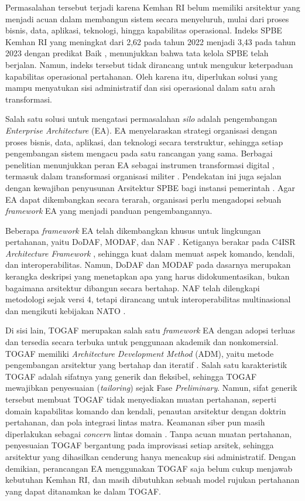 Permasalahan tersebut terjadi karena Kemhan RI belum memiliki arsitektur yang menjadi acuan dalam membangun sistem secara menyeluruh, mulai dari proses bisnis, data, aplikasi, teknologi, hingga kapabilitas operasional. Indeks SPBE Kemhan RI yang meningkat dari 2,62 pada tahun 2022 menjadi 3,43 pada tahun 2023 dengan predikat Baik \cite{Pusdatin2024}, menunjukkan bahwa tata kelola SPBE telah berjalan. Namun, indeks tersebut tidak dirancang untuk mengukur keterpaduan kapabilitas operasional pertahanan. Oleh karena itu, diperlukan solusi yang mampu menyatukan sisi administratif dan sisi operasional dalam satu arah transformasi.

Salah satu solusi untuk mengatasi permasalahan \textit{silo} adalah pengembangan \textit{Enterprise Architecture} (EA). EA menyelaraskan strategi organisasi dengan proses bisnis, data, aplikasi, dan teknologi secara terstruktur, sehingga setiap pengembangan sistem mengacu pada satu rancangan yang sama. Berbagai penelitian menunjukkan peran EA sebagai instrumen transformasi digital \cite{Syamfithriani2024}, termasuk dalam transformasi organisasi militer \cite{Mattila2022}. Pendekatan ini juga sejalan dengan kewajiban penyusunan Arsitektur SPBE bagi instansi pemerintah \cite{Perpres95Tahun2018}. Agar EA dapat dikembangkan secara terarah, organisasi perlu mengadopsi sebuah \textit{framework} EA yang menjadi panduan pengembangannya.

Beberapa \textit{framework} EA telah dikembangkan khusus untuk lingkungan pertahanan, yaitu DoDAF, MODAF, dan NAF \cite{DoDAF2010v202,Weilkiens2022,NAFv41}. Ketiganya berakar pada C4ISR \textit{Architecture Framework} \cite{C4ISRAWG1998}, sehingga kuat dalam memuat aspek komando, kendali, dan interoperabilitas. Namun, DoDAF dan MODAF pada dasarnya merupakan kerangka deskripsi yang menetapkan apa yang harus didokumentasikan, bukan bagaimana arsitektur dibangun secara bertahap. NAF telah dilengkapi metodologi sejak versi 4, tetapi dirancang untuk interoperabilitas multinasional dan mengikuti kebijakan NATO \cite{NAFv41}.

Di sisi lain, TOGAF merupakan salah satu \textit{framework} EA dengan adopsi terluas dan tersedia secara terbuka untuk penggunaan akademik dan nonkomersial. TOGAF memiliki \textit{Architecture Development Method} (ADM), yaitu metode pengembangan arsitektur yang bertahap dan iteratif \cite{TOGAF2022}. Salah satu karakteristik TOGAF adalah sifatnya yang generik dan fleksibel, sehingga TOGAF mewajibkan penyesuaian (\textit{tailoring}) sejak Fase \textit{Preliminary}. Namun, sifat generik tersebut membuat TOGAF tidak menyediakan muatan pertahanan, seperti domain kapabilitas komando dan kendali, penautan arsitektur dengan doktrin pertahanan, dan pola integrasi lintas matra. Keamanan siber pun masih diperlakukan sebagai \textit{concern} lintas domain \cite{TOGAFRiskSecurity}. Tanpa acuan muatan pertahanan, penyesuaian TOGAF bergantung pada improvisasi setiap arsitek, sehingga arsitektur yang dihasilkan cenderung hanya mencakup sisi administratif. Dengan demikian, perancangan EA menggunakan TOGAF saja belum cukup menjawab kebutuhan Kemhan RI, dan masih dibutuhkan sebuah model rujukan pertahanan yang dapat ditanamkan ke dalam TOGAF.

